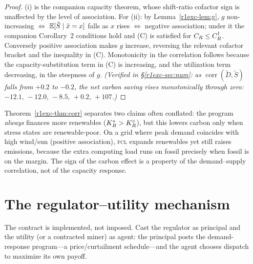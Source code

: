 \begin{proof}
(i) is the companion capacity theorem, whose shift-ratio cofactor sign is
unaffected by the level of association. For (ii): by Lemma~\ref{r1exc-lem:g},
$g$ non-increasing $\iff$ $\mathbb{E}[\tilde S\mid\tilde x=x]$ falls as $x$ rises $\iff$
negative association; under it the companion Corollary~2 conditions hold and (C)
is satisfied for $C_R\le C_R^{\dagger}$. Conversely positive association makes
$g$ increase, reversing the relevant cofactor bracket and the inequality in (C).
Monotonicity in the correlation follows because the capacity-substitution term in
(C) is increasing, and the utilization term decreasing, in the steepness of $g$.
\emph{(Verified in \S\ref{r1exc-sec:num}: as $\operatorname{corr}(\tilde D,\tilde S)$
falls from $+0.2$ to $-0.2$, the net carbon saving rises monotonically through
zero: $-12.1,\,-12.0,\,-8.5,\,+0.2,\,+107$.)}
\end{proof}

\begin{remark}
Theorem~\ref{r1exc-thm:corr} separates two claims often conflated: the program
\emph{always} finances more renewables ($K_R^{*}>K_R^{\circ}$), but this lowers carbon only
when stress states are renewable-poor. On a grid where peak demand coincides with
high wind/sun (positive association), \textsc{fcl} expands renewables yet still
raises emissions, because the extra computing load runs on fossil precisely when
fossil is on the margin. The sign of the carbon effect is a property of the
demand--supply correlation, not of the capacity response.
\end{remark}

\section{The regulator--utility mechanism}\label{r1exc-sec:pa}

The contract is implemented, not imposed. Cast the regulator as principal and the
utility (or a contracted miner) as agent: the principal posts the demand-response
program---a price/curtailment schedule---and the agent chooses dispatch to
maximize its own payoff.

